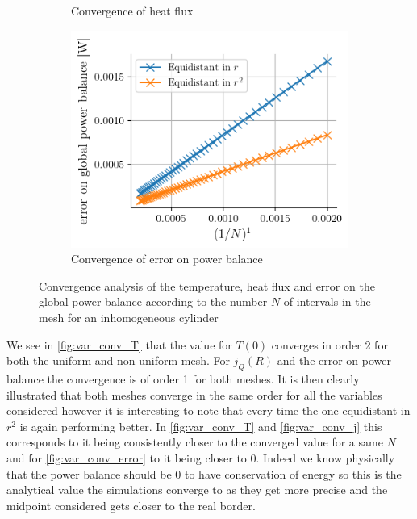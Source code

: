 \begin{figure}[H]
\begin{subfigure}{0.48\linewidth}
        \caption{Convergence of heat flux}
        \label{fig:var_conv_j}
    \end{subfigure}
    \begin{subfigure}{0.48\linewidth}
        \centering
        \includegraphics[width=\linewidth]{figures/var_conv_error.png}
        \caption{Convergence of error on power balance}
        \label{fig:var_conv_error}
    \end{subfigure}
    \caption{Convergence analysis of the temperature, heat flux and error on the global power balance according to the number $N$ of intervals in the mesh for an inhomogeneous cylinder}
    \label{fig:var_convergence}
\end{figure}

We see in \autoref{fig:var_conv_T} that the value for $T(0)$ converges in order 2 for both the uniform and non-uniform mesh. For $j_Q(R)$ and the error on power balance the convergence is of order 1 for both meshes. It is then clearly illustrated that both meshes converge in the same order for all the variables considered however it is interesting to note that every time the one equidistant in $r^2$ is again performing better. In \autoref{fig:var_conv_T} and \autoref{fig:var_conv_j} this corresponds to it being consistently closer to the converged value for a same $N$ and for \autoref{fig:var_conv_error} to it being closer to 0. Indeed we know physically that the power balance should be 0 to have conservation of energy so this is the analytical value the simulations converge to as they get more precise and the midpoint considered gets closer to the real border.

